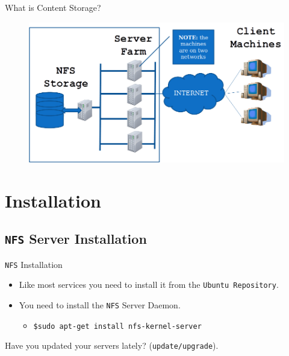\documentclass[xcolor=table,aspectratio=169]{beamer}
\begin{document}
\begin{frame}{What is Content Storage?}
  \begin{figure}
    \begin{center}
      \includegraphics[width=0.7\linewidth]{WhatIs.png}
    \end{center}
  \end{figure}
\end{frame}

\section{Installation}
\subsection{\texttt{NFS} Server Installation}
\begin{frame}{\texttt{NFS} Installation}
  \begin{itemize}
    \item Like most services you need to install it from the \texttt{Ubuntu Repository}.
    \item You need to install the \texttt{NFS} Server Daemon.
      \begin{itemize}
        \item \texttt{\$sudo apt-get install nfs-kernel-server}
      \end{itemize}
  \end{itemize}
  \begin{tcolorbox}
    \begin{center}
      \scriptsize Have you updated your servers lately? (\texttt{update/upgrade}).
    \end{center}
  \end{tcolorbox}
\end{frame}
\end{document}
